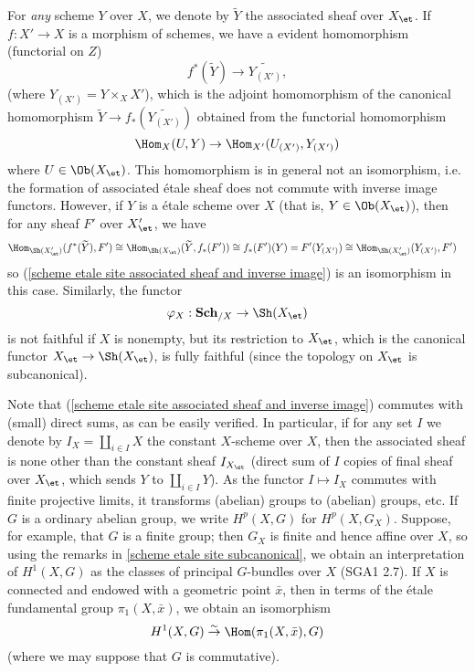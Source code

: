 \begin{remark}
For \textit{any} scheme $Y$ over $X$, we denote by $\widetilde{Y}$ the associated sheaf over $X_\et$. If $f:X'\to X$ is a morphism of schemes, we have a evident homomorphism (functorial on $Z$)
\begin{equation}\label{scheme etale site associated sheaf and inverse image}
f^*(\widetilde{Y})\to\widetilde{Y_{(X')}},
\end{equation}
(where $Y_{(X')}=Y\times_XX'$), which is the adjoint homomorphism of the canonical homomorphism $\widetilde{Y}\to f_*(\widetilde{Y_{(X')}})$ obtained from the functorial homomorphism
\[\Hom_X(U,Y)\to\Hom_{X'}(U_{(X')},Y_{(X')})\]
where $U\in\Ob(X_\et)$. This homomorphism is in general not an isomorphism, i.e. the formation of associated \'etale sheaf does not commute with inverse image functors. However, if $Y$ is a \'etale scheme over $X$ (that is, $Y\in\Ob(X_\et)$), then for any sheaf $F'$ over $X'_\et$, we have
\begin{align*}
\Hom_{\Sh(X'_\et)}(f^*(\widetilde{Y}),F')&\cong\Hom_{\Sh(X_\et)}(\widetilde{Y},f_*(F'))\cong f_*(F')(Y)=F'(Y_{(X')})\cong\Hom_{\Sh(X'_\et)}(Y_{(X')},F')
\end{align*}
so (\ref{scheme etale site associated sheaf and inverse image}) is an isomorphism in this case. Similarly, the functor
\[\varphi_X:\mathbf{Sch}_{/X}\to\Sh(X_\et)\]
is not faithful if $X$ is nonempty, but its restriction to $X_\et$, which is the canonical functor $X_\et\to\Sh(X_\et)$, is fully faithful (since the topology on $X_\et$ is subcanonical).\par
Note that (\ref{scheme etale site associated sheaf and inverse image}) commutes with (small) direct sums, as can be easily verified. In particular, if for any set $I$ we denote by $I_X=\coprod_{i\in I}X$ the constant $X$-scheme over $X$, then the associated sheaf is none other than the constant sheaf $I_{X_\et}$ (direct sum of $I$ copies of final sheaf over $X_\et$, which sends $Y$ to $\coprod_{i\in I}Y$). As the functor $I\mapsto I_X$ commutes with finite projective limits, it transforms (abelian) groups to (abelian) groups, etc. If $G$ is a ordinary abelian group, we write $H^p(X,G)$ for $H^p(X,G_X)$. Suppose, for example, that $G$ is a finite group; then $G_X$ is finite and hence affine over $X$, so using the remarks in \cref{scheme etale site subcanonical}, we obtain an interpretation of $H^1(X,G)$ as the classes of principal $G$-bundles over $X$ (SGA1  2.7). If $X$ is connected and endowed with a geometric point $\bar{x}$, then in terms of the \'etale fundamental group $\pi_1(X,\bar{x})$, we obtain an isomorphism
\begin{equation}\label{scheme etale site cohomology G coefficient is pi_1 Hom}
H^1(X,G)\stackrel{\sim}{\to}\Hom(\pi_1(X,\bar{x}),G)
\end{equation}
(where we may suppose that $G$ is commutative).
\end{remark}


